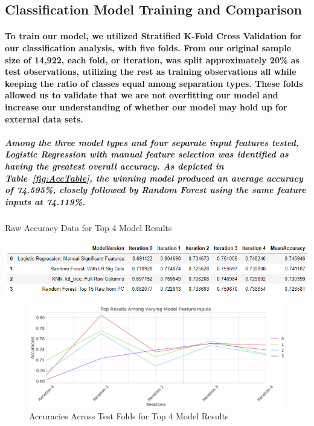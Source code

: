 \documentclass[10pt]{article}
\begin{document}
\subsection{Classification Model Training and Comparison}

\paragraph{To train our model, we utilized Stratified K-Fold Cross Validation for our classification analysis, with five folds. From our original sample size of 14,922, each fold, or iteration, was split approximately 20\% as test observations, utilizing the rest as training observations all while keeping the ratio of classes equal among separation types. These folds allowed us to validate that we are not overfitting our model and increase our understanding of whether our model may hold up for external data sets.}

\subparagraph{Among the three model types and four separate input features tested, Logistic Regression with manual feature selection was identified as having the greatest overall accuracy. As depicted in Table~\ref{fig:AccTable}, the winning model produced an average accuracy of 74.595\%, closely followed by Random Forest using the same feature inputs at 74.119\%.} 

\subparagraph{}
\begin{table}[H]
\centering
\caption{Raw Accuracy Data for Top 4 Model Results}
\includegraphics[width=\linewidth]{AccTable.jpg}
\label{fig:AccTable}
\end{table}

\begin{figure}[H]
\centering
\includegraphics[width=\linewidth]{AccPlot.jpg}
\caption{Accuracies Across Test Folds for Top 4 Model Results}
\label{fig:AccPlot}
\end{figure}
\end{document}

